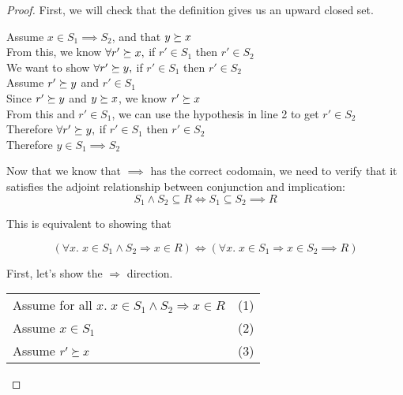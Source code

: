 \begin{proof}
First, we will check that the definition gives us an upward closed set.

\vspace{0.5em}

\begin{tabbedproof}
\oo Assume $x \in S_1 \implies S_2$, and that $y \succeq x$ \\
\ooo From this, we know $\forall r' \succeq x, $ if $r' \in S_1$ then $r' \in S_2$ \\
\ooo We want to show $\forall r' \succeq y, $ if $r' \in S_1$ then $r' \in S_2$ \\
\ooo Assume $r' \succeq y$ and $r' \in S_1$ \\
\oooo Since $r' \succeq y$ and $y \succeq x$, we know $r' \succeq x$ \\
\oooo From this  and $r' \in S_1$, we can use the hypothesis in line 2 to get $r' \in S_2$ \\
\ooo Therefore $\forall r' \succeq y, $ if $r' \in S_1$ then $r' \in S_2$ \\
\oo Therefore $y \in S_1 \implies S_2$
\end{tabbedproof}

\noindent Now that we know that $\implies$ has the correct codomain, we need to
verify that it satisfies the adjoint relationship between conjunction and 
implication: 
\begin{displaymath}
S_1 \land S_2 \subseteq R \iff S_1 \subseteq S_2 \implies R
\end{displaymath}

\noindent This is equivalent to showing that 

\begin{displaymath}
(\forall x.\; x \in S_1 \land S_2 \Rightarrow x \in R) \iff
(\forall x.\; x \in S_1 \Rightarrow x \in S_2 \implies R)
\end{displaymath}

\noindent First, let's show the $\Rightarrow$ direction.
\\

\begin{tabular}{ll}
Assume for all $x.\; x \in S_1 \land S_2 \Rightarrow x \in R$ &
(1)
\\

Assume $x \in S_1$ &
(2)
\\

Assume $r' \succeq x$ &
(3)
\\


\end{tabular}
\end{proof}

